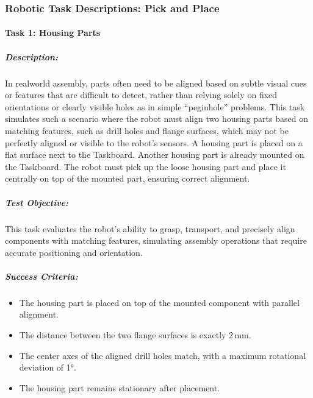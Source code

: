 \documentclass[letterpaper,10pt,english]{sphinxmanual}
\begin{document}
\sphinxstepscope


\subsubsection{Robotic Task Descriptions: Pick and Place}
\label{\detokenize{robotic_instructions_pick_and_place:robotic-task-descriptions-pick-and-place}}\label{\detokenize{robotic_instructions_pick_and_place::doc}}

\paragraph{Task 1: Housing Parts}
\label{\detokenize{robotic_instructions_pick_and_place:task-1-housing-parts}}

\subparagraph{Description:}
\label{\detokenize{robotic_instructions_pick_and_place:description}}
\sphinxAtStartPar
In real\sphinxhyphen{}world assembly, parts often need to be aligned based on subtle visual cues or features that are difficult to detect,
rather than relying solely on fixed orientations or clearly visible holes as in simple “peg\sphinxhyphen{}in\sphinxhyphen{}hole” problems.
This task simulates such a scenario where the robot must align two housing parts based on matching features,
such as drill holes and flange surfaces, which may not be perfectly aligned or visible to the robot’s sensors.
A housing part is placed on a flat surface next to the Taskboard. Another housing part is already mounted on the Taskboard.
The robot must pick up the loose housing part and place it centrally on top of the mounted part, ensuring correct alignment.


\subparagraph{Test Objective:}
\label{\detokenize{robotic_instructions_pick_and_place:test-objective}}
\sphinxAtStartPar
This task evaluates the robot’s ability to grasp, transport, and precisely align components with matching features,
simulating assembly operations that require accurate positioning and orientation.


\subparagraph{Success Criteria:}
\label{\detokenize{robotic_instructions_pick_and_place:success-criteria}}\begin{itemize}
\item {} 
\sphinxAtStartPar
The housing part is placed on top of the mounted component with parallel alignment.

\item {} 
\sphinxAtStartPar
The distance between the two flange surfaces is exactly 2 mm.

\item {} 
\sphinxAtStartPar
The center axes of the aligned drill holes match, with a maximum rotational deviation of 1°.

\item {} 
\sphinxAtStartPar
The housing part remains stationary after placement.

\end{itemize}
\end{document}
